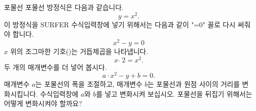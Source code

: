 ﻿\begin{surferPage}{포물선}
포물선 방정식은 다음과 같습니다.  \[y=x^2.\]
이 방정식을 SURFER 수식입력창에 넣기 위해서는 다음과 같이 "=0" 꼴로 다시 써줘야 합니다.
\[x^2-y=0\]
$x$ 위의 조그마한 기호(\;$\hat{}$\;)는 거듭제곱을 나타냅니다.  
\[ x  \,\hat{\ } \, 2 =x^2.\]
두 개의 매개변수를 더 넣어 봅시다.
\[a \cdot x^2-y+b=0.\]
매개변수 $a$는 포물선의 폭을 조절하고, 매개변수 $b$는 포물선과 원점 사이의 거리를 변화시킵니다. 
\newline
수식입력창에 $a$와 $b$를 넣고 변화시켜 보십시오. 포물선을 뒤집기 위해서는 어떻게 변화시켜야 할까요?
\end{surferPage}
